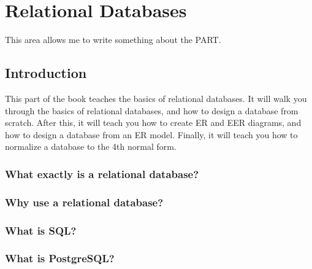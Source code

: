 

\part{Relational Databases}
\label{part:relationaldatabases}
This  area allows me to write something about the PART.

\chapter{Introduction}
\label{chap:relational:introduction}
This part of the book teaches the basics of relational databases. It will walk you through the basics of relational databases, and how to design a database from scratch. After this, it will teach you how to create ER and EER diagrams, and how to design a database from an ER model. Finally, it will teach you how to normalize a database to the 4th normal form.


\section{What exactly is a relational database?}

\section{Why use a relational database?}

\section{What is SQL?}

\section{What is PostgreSQL?}


